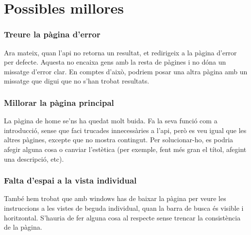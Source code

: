 \section{Possibles millores}
\subsubsection{Treure la p\`agina d'error}
Ara mateix, quan l'api no retorna un resultat,
et redirigeix a la p\`agina d'error per defecte.
Aquesta no encaixa gens amb la resta de p\`agines i no d\'ona un missatge d'error clar.
En comptes d'aix\`o, podriem posar una altra p\`agina
amb un missatge que digui que no s'han trobat resultats.

\subsubsection{Millorar la p\`agina principal}
La p\`agina de home se'ns ha quedat molt buida.
Fa la seva funci\'o com a introducci\'o, sense que faci trucades innecess\`aries a l'api,
per\`o es veu igual que les altres p\`agines, excepte que no mostra contingut.
Per solucionar-ho, es podria afegir alguna cosa o canviar l'est\`etica
(per exemple, fent m\'es gran el t\'itol, afegint una descripci\'o, etc).

\subsubsection{Falta d'espai a la vista individual}
Tamb\'e hem trobat que amb windows has de baixar la p\`agina per veure les instruccions
a les vistes de beguda individual,
quan la barra de busca \'es visible i horitzontal.
S'hauria de fer alguna cosa al respecte
sense trencar la consist\`encia de la p\`agina.
